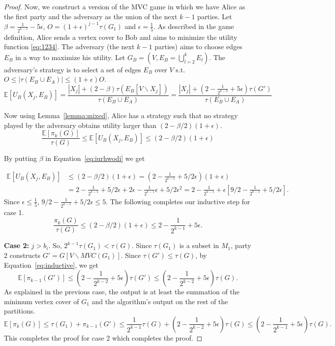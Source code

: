\documentclass[11pt]{article}
\newcommand{\E}[0]{\ensuremath{\mathbb{E}}}
\newcommand{\mvc}[1]{\tau\left(#1 \right)}
\begin{document}
\begin{proof}
    
    Now, we construct a version of the MVC game in which we have Alice as the first party and
    the adversary as the union of the next $k-1$ parties. Let $\beta = \frac{1}{2^{k-1}} - 5 \epsilon$, $O = (1 + \epsilon)^{j-1} \mvc{G_1}$ and $\epsilon = \frac{1}{5}$.
     As described in the game definition, Alice sends a vertex cover to Bob and aims to minimize the utility function \ref{eq:1234}. The adversary (the next $k-1$ parties) aims to choose edges $E_B$ in a way to maximize his utility. Let $G_B = (V, E_B = \bigcup_{l= 2}^{k} E_l)$. The adversary's strategy is to select a set of edges $E_B$ over $V$ s.t. $O \leq |\mvc{E_B \cup E_A}| \leq (1 + \epsilon) O$. 
     \begin{equation}
     \label{eq:1234}
         \E[U_B(X_{j} , E_B)] = \frac{|X_{j}| + (2 - \beta)\mvc{E_B[V \backslash X_{j}]}}{\mvc{E_B \cup E_A}} = \frac{|X_{j}| + (2 - \frac{1}{2^{k-2}} + 5\epsilon)\mvc{G'}}{\mvc{E_B \cup E_A}}
     \end{equation}
    

    Now using Lemma~\ref{lemma:mixed}, Alice has a strategy such that
    no strategy played by the adversary obtains utility larger than
    $(2 - \beta/2)(1 + \epsilon)$.
    \begin{equation}\label{eq:iurhwodi}
        \frac{\E[\pi_k(G)]}{\mvc{G}}  \leq \E [U_B(X_{j}, E_B)]  \leq (2 - \beta/2)(1 + \epsilon)
    \end{equation}
   
    By putting $\beta$ in Equation~\ref{eq:iurhwodi} we get
  
    \begin{align*}
        \E [U_B(X_{j}, E_B)] & \leq (2 - \beta/2)(1 + \epsilon) = (2 - \frac{1}{2^{k-1}} + 5/2 \epsilon)(1 + \epsilon) \\
        & = 2 - \frac{1}{2^{k-1}} + 5/2 \epsilon  + 2\epsilon - \frac{1}{2^{k-1}} \epsilon + 5/2 \epsilon^2 = 2 - \frac{1}{2^{k-1}} + \epsilon [9/2 - \frac{1}{2^{k-1}} + 5/2 \epsilon]. 
    \end{align*} 
    Since $\epsilon \leq \frac{1}{5}$, $9/2 -\frac{1}{2^{k-1}} + 5/2 \epsilon \leq 5.$   The following completes our inductive step for case 1.
    \[\frac{\pi_k(G)}{\mvc{G}} \leq (2 - \beta/2)(1 + \epsilon) \leq 2 - \frac{1}{2^{k-1}} + 5 \epsilon.\]

    
    \textbf{Case 2:} $j > b_i$. So, $2^{k-1} \mvc{G_1} < \mvc{G}$. Since $\mvc{G_1}$ is a subset in $M_{1}$, party 2 constructs $G' = G[V \backslash MVC(G_1)]$.  Since $\mvc{G'} \leq \mvc{G}$, by Equation~\ref{eq:inductive}, we get \[\E[\pi_{k-1}(G')] \leq (2 - \frac{1}{2^{k-2}} + 5\epsilon) \mvc{G'} \leq (2 - \frac{1}{2^{k-2}} + 5\epsilon) \mvc{G}.\]
    As explained in the previous case, the output is at least the summation of the minimum vertex cover of $G_1$ and the algorithm's output on the rest of the partitions.
    \[\E[\pi_{k}(G)] \leq \mvc{G_1} + \pi_{k-1}(G') \leq \frac{1}{2^{k-1}} \mvc{G} + (2 - \frac{1}{2^{k-2}} + 5\epsilon) \mvc{G} \leq (2 - \frac{1}{2^{k-1}} + 5 \epsilon ) \mvc{G}.\]
   This completes the proof for case 2 which completes the proof.
\end{proof}
\end{document}
